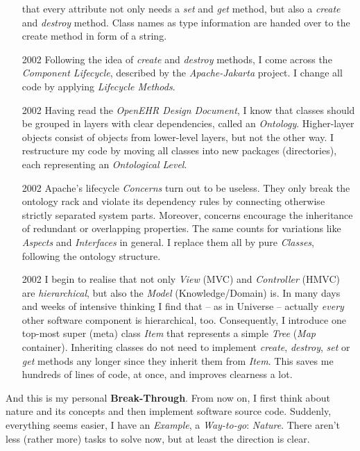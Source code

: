 \begin{itemize}
        that every attribute not only needs a \emph{set} and \emph{get} method,
        but also a \emph{create} and \emph{destroy} method. Class names as type
        information are handed over to the create method in form of a string.
    \item[2002] Following the idea of \emph{create} and \emph{destroy} methods,
        I come across the \emph{Component Lifecycle}, described by the
        \emph{Apache-Jakarta} project. I change all code by applying
        \emph{Lifecycle Methods}.
    \item[2002] Having read the \emph{OpenEHR Design Document}, I know that
        classes should be grouped in layers with clear dependencies, called an
        \emph{Ontology}. Higher-layer objects consist of objects from lower-level
        layers, but not the other way. I restructure my code by moving all
        classes into new packages (directories), each representing an
        \emph{Ontological Level}.
    \item[2002] Apache's lifecycle \emph{Concerns} turn out to be useless. They
        only break the ontology rack and violate its dependency rules by
        connecting otherwise strictly separated system parts. Moreover, concerns
        encourage the inheritance of redundant or overlapping properties. The
        same counts for variations like \emph{Aspects} and \emph{Interfaces} in
        general. I replace them all by pure \emph{Classes}, following the
        ontology structure.
    \item[2002] I begin to realise that not only \emph{View} (MVC) and
        \emph{Controller} (HMVC) are \emph{hierarchical}, but also the
        \emph{Model} (Knowledge/Domain) is. In many days and weeks of intensive
        thinking I find that -- as in Universe -- actually \emph{every} other
        software component is hierarchical, too. Consequently, I introduce one
        top-most super (meta) class \emph{Item} that represents a simple
        \emph{Tree} (\emph{Map} container). Inheriting classes do not need to
        implement \emph{create}, \emph{destroy}, \emph{set} or \emph{get}
        methods any longer since they inherit them from \emph{Item}. This saves
        me hundreds of lines of code, at once, and improves clearness a lot.
\end{itemize}

And this is my personal \textbf{Break-Through}. From now on, I first think
about nature and its concepts and then implement software source code.
Suddenly, everything seems easier, I have an \emph{Example}, a
\emph{Way-to-go}: \emph{Nature}. There aren't less (rather more) tasks to solve
now, but at least the direction is clear.

